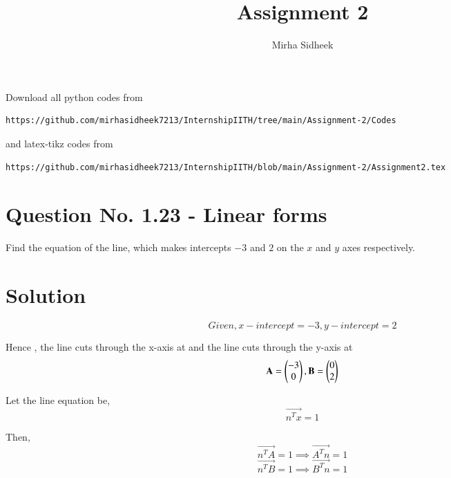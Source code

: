 \documentclass[journal,12pt,twocolumn]{IEEEtran}
\begin{document}
     \def\centbox#1{\makebox[0in]{#1}}
     \def\topbox#1{\raisebox{-\baselineskip}[0in][0in]{#1}}
     \def\midbox#1{\raisebox{-0.5\baselineskip}[0in][0in]{#1}}
\vspace{3cm}
\title{Assignment 2}
\author{Mirha Sidheek}
\maketitle
\newpage
\bigskip
\renewcommand{\thefigure}{\theenumi}
\renewcommand{\thetable}{\theenumi}
Download all python codes from 
\begin{lstlisting}
https://github.com/mirhasidheek7213/InternshipIITH/tree/main/Assignment-2/Codes
\end{lstlisting}

%
and latex-tikz codes from 
%
\begin{lstlisting}
https://github.com/mirhasidheek7213/InternshipIITH/blob/main/Assignment-2/Assignment2.tex
\end{lstlisting}

\section{Question No. 1.23 - Linear forms}

 Find the equation of the line, which makes intercepts $-3$ and $2$ on the $x$ and $y$ axes respectively.
%
\section{Solution}
\begin{equation}
Given, x-intercept=-3, y-intercept = 2
\end{equation}

Hence , the line cuts through the x-axis at  and the line cuts through the y-axis at 
\begin{equation}
\mathbf{A} = {\begin{pmatrix}-3\\0\end{pmatrix} , \mathbf{B} = \begin{pmatrix}0\\2\end{pmatrix}}
\end{equation}



Let the line equation be,
\begin{equation}
    \vec{n^Tx}=1
\end{equation}

Then,
\begin{equation}
    \vec{n^TA}=1 \implies \vec{A^Tn}=1
\end{equation}
\begin{equation}
\vec{n^TB}=1 \implies \vec{B^Tn}=1
\end{equation}
\end{document}
